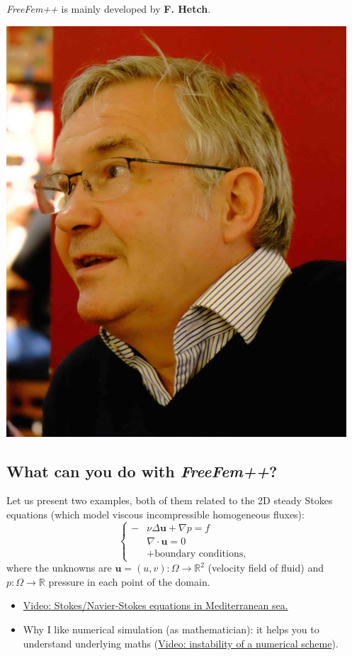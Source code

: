 \documentclass[12pt]{article}
\newcommand{\FF}{\textit{FreeFem++}\xspace}
\newcommand{\R}{{\mathbb R}}
\begin{document}
\FF is mainly developed by \textbf{F. Hetch}.
\begin{center}
  \includegraphics[width=0.3\linewidth]{./Hecht-portrait}
\end{center}

\subsection{What can you do with \FF?}
Let us present two examples, both of them related to the 2D steady
Stokes equations (which model viscous incompressible homogeneous fluxes):
\begin{equation*}
  \left\{
  \begin{aligned}
    -&\nu\Delta \mathbf{u}+ \nabla p= f
    \\
    &\nabla\cdot \mathbf{u}  = 0
    \\ & + \text{boundary conditions},
  \end{aligned}
  \right.
\end{equation*}
where the unknowns are $\mathbf{u}=(u,v):\Omega\to\R^2$ (velocity field of fluid)
and $p:\Omega\to\R$ pressure in each point of the domain.
\begin{itemize}
\item
  \href{https://www.youtube.com/watch?v=dn4UeMQDf9c&index=2&list=UUbv6VZ2UBw4iXCMR2L4G0zg&t=0s}{Video:
    Stokes/Navier-Stokes equations in Mediterranean sea.}
\item Why I like numerical simulation (as mathematician): it helps you
  to understand underlying maths
  (\href{https://www.youtube.com/watch?v=6x8KseewSrU&feature=youtu.be}{Video:
    instability of a numerical scheme}).
\end{itemize}
\end{document}
